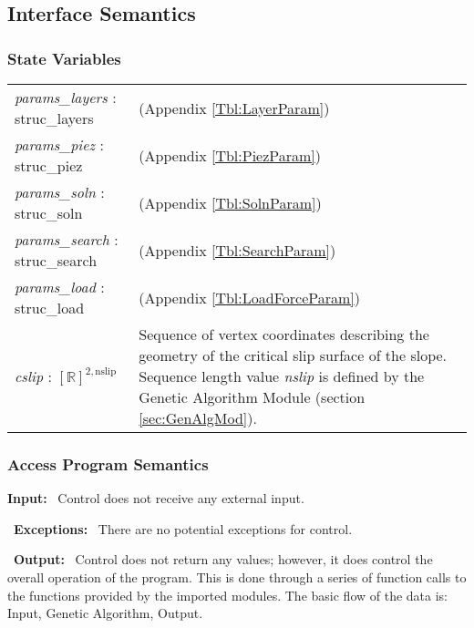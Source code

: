 \documentclass[12pt, titlepage]{article}
\begin{document}
\subsection{Interface Semantics}

\subsubsection{State Variables}

\renewcommand*{\arraystretch}{1.5}
\begin{longtable}{p{}
    p{}}
  
  \textit{params\_layers} : struc\_layers & (Appendix
  \ref{Tbl:LayerParam})\\

  \textit{params\_piez} : struc\_piez & (Appendix
  \ref{Tbl:PiezParam})\\

  \textit{params\_soln} : struc\_soln & (Appendix
  \ref{Tbl:SolnParam})\\

  \textit{params\_search} : struc\_search & (Appendix
  \ref{Tbl:SearchParam})\\

  \textit{params\_load} : struc\_load & (Appendix
  \ref{Tbl:LoadForceParam})\\

  \textit{cslip} : $[\mathbb{R}]^{2,\text{nslip}}$ & Sequence of
  vertex coordinates describing the geometry of the critical slip
  surface of the slope. Sequence length value \textit{nslip} is
  defined by the Genetic Algorithm Module (section
  \ref{sec:GenAlgMod}).
\end{longtable}

\subsubsection{Access Program Semantics}

\textbf{Input:} ~\newline Control does not receive any external input.

~\newline\noindent \textbf{Exceptions:} ~\newline There are no
potential exceptions for control.

~\newline\noindent \textbf{Output:} ~\newline Control does not return
any values; however, it does control the overall operation of the
program. This is done through a series of function calls to the
functions provided by the imported modules.  The basic flow of the
data is: Input, Genetic Algorithm, Output.
\end{document}

